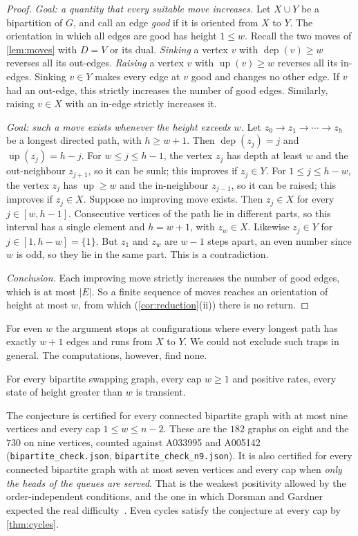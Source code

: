 \documentclass[11pt,a4paper]{article}
\theoremstyle{plain}
\theoremstyle{plain}
\newcommand{\dep}{\operatorname{dep}}
\newcommand{\up}{\operatorname{up}}
\begin{document}
\begin{proof}
\emph{Goal: a quantity that every suitable move increases.} Let $X\cup Y$ be a bipartition of $G$, and call an edge \emph{good} if it is oriented from $X$ to $Y$. The orientation in which all edges are good has height $1\le w$. Recall the two moves of \cref{lem:moves} with $D=V$ or its dual. \emph{Sinking} a vertex $v$ with $\dep(v)\ge w$ reverses all its out-edges. \emph{Raising} a vertex $v$ with $\up(v)\ge w$ reverses all its in-edges. Sinking $v\in Y$ makes every edge at $v$ good and changes no other edge. If $v$ had an out-edge, this strictly increases the number of good edges. Similarly, raising $v\in X$ with an in-edge strictly increases it.

\emph{Goal: such a move exists whenever the height exceeds $w$.} Let $z_0\to z_1\to\cdots\to z_h$ be a longest directed path, with $h\ge w+1$. Then $\dep(z_j)=j$ and $\up(z_j)=h-j$. For $w\le j\le h-1$, the vertex $z_j$ has depth at least $w$ and the out-neighbour $z_{j+1}$, so it can be sunk; this improves if $z_j\in Y$. For $1\le j\le h-w$, the vertex $z_j$ has $\up\ge w$ and the in-neighbour $z_{j-1}$, so it can be raised; this improves if $z_j\in X$. Suppose no improving move exists. Then $z_j\in X$ for every $j\in[w,h-1]$. Consecutive vertices of the path lie in different parts, so this interval has a single element and $h=w+1$, with $z_w\in X$. Likewise $z_j\in Y$ for $j\in[1,h-w]=\{1\}$. But $z_1$ and $z_w$ are $w-1$ steps apart, an even number since $w$ is odd, so they lie in the same part. This is a contradiction.

\emph{Conclusion.} Each improving move strictly increases the number of good edges, which is at most $|E|$. So a finite sequence of moves reaches an orientation of height at most $w$, from which (\cref{cor:reduction}(ii)) there is no return.
\end{proof}

For even $w$ the argument stops at configurations where every longest path has exactly $w+1$ edges and runs from $X$ to $Y$. We could not exclude such traps in general. The computations, however, find none.

\begin{conjecture}\label{conj:bipartite}
For every bipartite swapping graph, every cap $w\ge1$ and positive rates, every state of height greater than $w$ is transient.
\end{conjecture}

The conjecture is certified for every connected bipartite graph with at most nine vertices and every cap $1\le w\le n-2$. These are the $182$ graphs on eight and the $730$ on nine vertices, counted against A033995 and A005142~\cite{OEIS} (\texttt{bipartite\_check.json}, \texttt{bipartite\_check\_n9.json}). It is also certified for every connected bipartite graph with at most seven vertices and every cap when \emph{only the heads of the queues are served}. That is the weakest positivity allowed by the order-independent conditions, and the one in which Dorsman and Gardner expected the real difficulty~\cite[Appendix~C.2]{DG2024}. Even cycles satisfy the conjecture at every cap by \cref{thm:cycles}.
\end{document}
